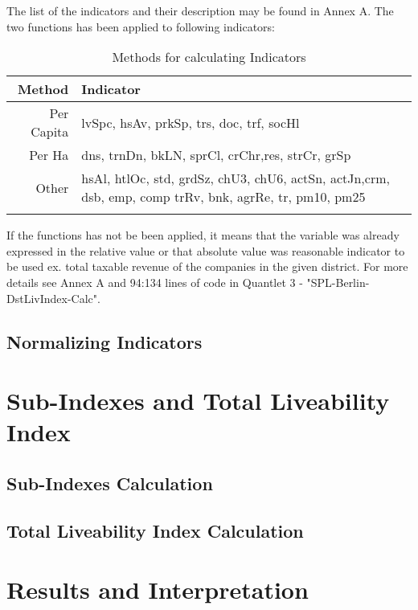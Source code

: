 The list of the indicators and their description may be found in Annex A. The two functions has been applied to following indicators:
 \begin{table}[ht]
\centering
\begin{tabular}{rll}
  \hline
 Method & Indicator \\ 
  \hline
 Per Capita & lvSpc, hsAv, prkSp, trs, doc, trf, socHl \\ 
 Per Ha & \parbox[t]{8cm}{dns, trnDn, bkLN, sprCl, crChr,res, strCr, grSp}  \\ 
 Other & \parbox[t]{8cm}{hsAl, htlOc, std, grdSz, chU3, chU6, actSn, actJn,crm, dsb, emp, comp trRv, bnk, agrRe, tr, pm10, pm25} \\ 
   \hline
\caption{Methods for calculating Indicators}
\end{tabular}
\end{table}
If the functions has not be been applied, it means that the variable was already expressed in the relative value or that absolute value was reasonable indicator to be used ex. total taxable revenue of the companies in the given district. For more details see Annex A and 94:134 lines of code in Quantlet 3 - "SPL-Berlin-DstLivIndex-Calc".  

\subsection{Normalizing Indicators}

\section{Sub-Indexes and Total Liveability Index}

\subsection{Sub-Indexes Calculation}

\subsection{Total Liveability Index Calculation}



\section{Results and Interpretation}

